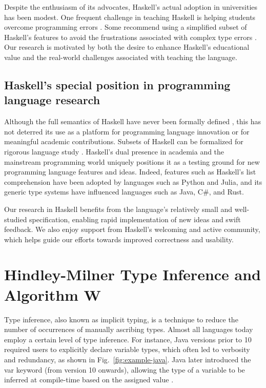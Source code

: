 Despite the enthusiasm of its advocates, Haskell's actual adoption in universities has been modest. One frequent challenge in teaching Haskell is helping students overcome programming errors \cite{Jun2000-yu, Tirronen2015-nr}. Some recommend using a simplified subset of Haskell's features to avoid the frustrations associated with complex type errors \cite{Heeren2003-kd}. Our research is motivated by both the desire to enhance Haskell's educational value and the real-world challenges associated with teaching the language.

\subsection*{Haskell's special position in programming language research}

Although the full semantics of Haskell have never been formally defined \cite{Hudak2007-kn}, this has not deterred its use as a platform for programming language innovation or for meaningful academic contributions. Subsets of Haskell can be formalized for rigorous language study \cite{FaxEn2002-nd}. Haskell's dual presence in academia and the mainstream programming world uniquely positions it as a testing ground for new programming language features and ideas. Indeed, features such as Haskell's list comprehension have been adopted by languages such as Python and Julia, and its generic type systems have influenced languages such as Java, C\#, and Rust.

Our research in Haskell benefits from the language's relatively small and well-studied specification, enabling rapid implementation of new ideas and swift feedback. We also enjoy support from Haskell's welcoming and active community, which helps guide our efforts towards improved correctness and usability.

\section{Hindley-Milner Type Inference and Algorithm W} \label{sec:hm-inference}

Type inference, also known as implicit typing, is a technique to reduce the number of occurrences of manually ascribing types. Almost all languages today employ a certain level of type inference. For instance, Java versions prior to 10 required users to explicitly declare variable types, which often led to verbosity and redundancy, as shown in Fig.~\ref{fig:example-java}. Java later introduced the var keyword (from version 10 onwards), allowing the type of a variable to be inferred at compile-time based on the assigned value \cite{Java_Developers2023-an}.  

